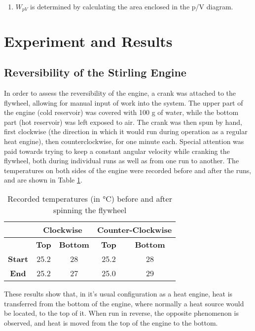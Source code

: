 \documentclass[titlepage]{article}
\begin{document}
\begin{enumerate}
    \item \(W_{pV}\) is determined by calculating the area enclosed in the p/V diagram.
\end{enumerate}


\newpage
\section{Experiment and Results}

\subsection{Reversibility of the Stirling Engine}
In order to assess the reversibility of the engine, a crank was attached to the flywheel, allowing for manual input of work into the system. The upper part of the engine (cold reservoir) was covered with 100 g of water, while the bottom part (hot reservoir) was left exposed to air.
The crank was then spun by hand, first clockwise (the direction in which it would run during operation as a regular heat engine), then counterclockwise, for one minute each. Special attention was paid towards trying to keep a constant angular velocity while cranking the flywheel, both during individual runs as well as from one run to another.
The temperatures on both sides of the engine were recorded before and after the runs, and are shown in Table \ref{tb_manual_temps}.

\begin{table}[H]
    \centering
    \caption{Recorded temperatures (in °C) before and after spinning the flywheel}
    \label{tb_manual_temps}
    \begin{tabular}{|c|c|c|c|c|}
        \hline
        & \multicolumn{2}{|c|}{\textbf{Clockwise}} & \multicolumn{2}{|c|}{\textbf{Counter-Clockwise}}
        \\
        \hline
        & \textbf{Top} & \textbf{Bottom} & \textbf{Top} & \textbf{Bottom}
        \\
        \hline
        \textbf{Start} & 25.2 & 28 & 25.2 & 28
        \\
        \hline
        \textbf{End} & 25.2 & 27 & 25.0 & 29
        \\
        \hline
    \end{tabular}
\end{table}
%
\noindent These results show that, in it's usual configuration as a heat engine, heat is transferred from the bottom of the engine, where normally a heat source would be located, to the top of it. When run in reverse, the opposite phenomenon is observed, and heat is moved from the top of the engine to the bottom.
\end{document}
